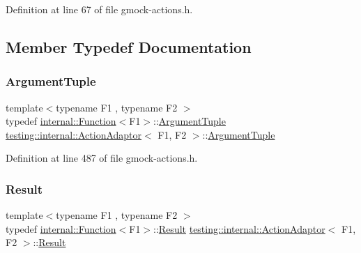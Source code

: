 Definition at line 67 of file gmock-\/actions.\+h.



\subsection{Member Typedef Documentation}
\mbox{\label{classtesting_1_1internal_1_1ActionAdaptor_a4f78fb73f97b72fea8a93b78a8ab5704}} 
\subsubsection{\texorpdfstring{Argument\+Tuple}{ArgumentTuple}}
{\footnotesize\ttfamily template$<$typename F1 , typename F2 $>$ \\
typedef \hyperlink{structtesting_1_1internal_1_1Function}{internal\+::\+Function}$<$F1$>$\+::\hyperlink{classtesting_1_1internal_1_1ActionAdaptor_a4f78fb73f97b72fea8a93b78a8ab5704}{Argument\+Tuple} \hyperlink{classtesting_1_1internal_1_1ActionAdaptor}{testing\+::internal\+::\+Action\+Adaptor}$<$ F1, F2 $>$\+::\hyperlink{classtesting_1_1internal_1_1ActionAdaptor_a4f78fb73f97b72fea8a93b78a8ab5704}{Argument\+Tuple}}



Definition at line 487 of file gmock-\/actions.\+h.

\mbox{\label{classtesting_1_1internal_1_1ActionAdaptor_afa8f7872b6db3d8f1545fd98b45b0b95}} 
\subsubsection{\texorpdfstring{Result}{Result}}
{\footnotesize\ttfamily template$<$typename F1 , typename F2 $>$ \\
typedef \hyperlink{structtesting_1_1internal_1_1Function}{internal\+::\+Function}$<$F1$>$\+::\hyperlink{classtesting_1_1internal_1_1ActionAdaptor_afa8f7872b6db3d8f1545fd98b45b0b95}{Result} \hyperlink{classtesting_1_1internal_1_1ActionAdaptor}{testing\+::internal\+::\+Action\+Adaptor}$<$ F1, F2 $>$\+::\hyperlink{classtesting_1_1internal_1_1ActionAdaptor_afa8f7872b6db3d8f1545fd98b45b0b95}{Result}}



